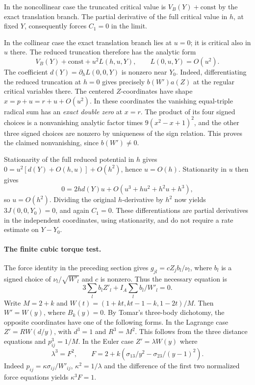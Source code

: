 \documentclass[11pt]{article}
\begin{document}
In the noncollinear case the truncated critical value is
\(V_B(Y)+\mathrm{const}\) by the exact translation branch. The
partial derivative of the full critical value in \(h\), at fixed
\(Y\), consequently forces \(C_1=0\) in the limit.

In the collinear case the exact translation branch lies at \(u=0\);
it is critical also in \(u\) there. The reduced truncation therefore
has the analytic form
\[
  V_B(Y)+\mathrm{const}+u^2 L(h,u,Y),\qquad L(0,u,Y)=O(u^2).
\]
The coefficient \(d(Y)=\partial_h L(0,0,Y)\) is nonzero near
\(Y_0\). Indeed, differentiating the reduced truncation at \(h=0\)
gives precisely \(b(W')a(Z)\) at the regular critical variables there.
The centered \(Z\)-coordinates have shape \(x=p+u=r+u+O(u^2)\).
In these coordinates the vanishing equal-triple radical sum has an
\emph{exact double zero} at \(x=r\). The product of its four signed
choices is a nonvanishing analytic factor times \(9(x^2-x+1)^2\),
and the other three signed choices are nonzero by uniqueness of the
sign relation. This proves the claimed nonvanishing, since \(b(W')\ne0\).

Stationarity of the full reduced potential in \(h\) gives
\(0=u^2[d(Y)+O(h,u)]+O(h^2)\), hence \(u=O(h)\). Stationarity
in \(u\) then gives
\[
 0=2h d(Y)u+O(u^3+h u^2+h^2u+h^3),
\]
so \(u=O(h^2)\). Dividing the original \(h\)-derivative by \(h^2\)
now yields \(3J(0,0,Y_0)=0\), and again \(C_1=0\). These differentiations
are partial derivatives in the independent coordinates, using
stationarity, and do not require a rate estimate on \(Y-Y_0\).

\paragraph{The finite cubic torque test.}
The force identity in the preceding section gives \(g_{jl}=c Z_j b_l/\nu_l\),
where \(b_l\) is a signed choice of \(\nu_l/\sqrt{W'_l}\) and \(c\)
is nonzero. Thus the necessary equation is
\[
  3\sum_l b_l Z'_l + I_A\sum_l b_l/W'_l=0.
\]
Write \(M=2+k\) and
\(W(t)=(1+kt,kt-1-k,1-2t)/M\).
Then \(W'=W(y)\), where \(B_k(y)=0\). By Tomar's three-body
dichotomy, the opposite coordinates have one of the following forms.
In the Lagrange case \(Z'=R W(d/y)\), with \(d^3=1\) and \(R^3=M^2\).
This follows from the three distance equations and \(p_{ij}^3=1/M\).
In the Euler case \(Z'=\lambda W(y)\) where
\[
 \lambda^3=F^2,\qquad
 F=2+k\left(\sigma_{13}/y^2-\sigma_{23}/(y-1)^2\right).
\]
Indeed \(p_{ij}=\kappa\sigma_{ij}/W'_{ij}\), \(\kappa^2=1/\lambda\)
and the difference of the first two normalized force equations yields
\(\kappa^3F=1\).
\end{document}
